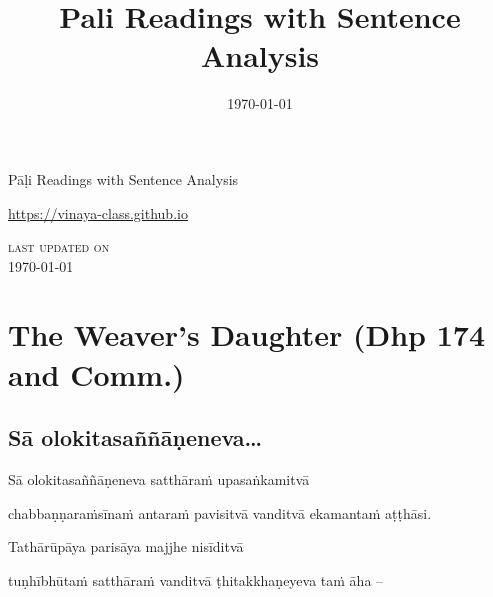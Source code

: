 \documentclass[11pt,oneside]{memoir}
\date{\today}
\title{Pali Readings with Sentence Analysis}
\begin{document}
\maketitle
\frontmatter

{\centering

{\Huge Pāḷi Readings with Sentence Analysis}

\bigskip
\href{https://vinaya-class.github.io}{https://vinaya-class.github.io}

{\scshape\small last updated on}\\
\today

}

\bigskip
\tableofcontents*

\mainmatter

\yournamefalse

\newlength{\colOne}\setlength{\colOne}{0.35\linewidth}
\newlength{\colTwo}\setlength{\colTwo}{0.6\linewidth}

\renewenvironment{quote}%
{\list{}{%
    \doubleLineSize
    \listparindent 0pt
    \itemindent    0pt
    \leftmargin    3em
    \rightmargin   3em
    \parsep        0pt
    \topsep        8pt
    \partopsep     0pt}%
\item[] \raggedright}%
{\endlist}

\chapter{The Weaver's Daughter (Dhp 174 and Comm.)}
\label{sec:orgb4aa596}
\section{Sā olokitasaññāṇeneva\ldots{}}
\label{sec:org4511d85}

\begin{quote}
Sā olokitasaññāṇeneva satthāraṁ upasaṅkamitvā

chabbaṇṇaraṁsīnaṁ antaraṁ pavisitvā vanditvā ekamantaṁ aṭṭhāsi.

Tathārūpāya parisāya majjhe nisīditvā

tuṇhībhūtaṁ satthāraṁ vanditvā ṭhitakkhaṇeyeva taṁ āha –
\end{quote}
\end{document}
